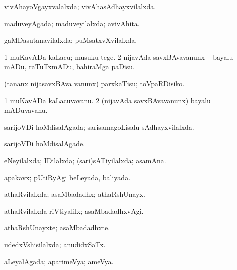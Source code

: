 \bentry
{} 
\gl{\gu}
\expl{}
\bmng
vivAhayoVgayxvalalxda; vivAhasAdhayxvilalxda. 
\emng
\eentry

\bentry
{} 
\gl{\gu}
\expl{}
\bmng
maduveyAgada; maduveyilalxda; avivAhita. 
\emng
\eentry

\bentry
{} 
\gl{\gu}
\expl{}
\bmng
gaMDasutanavilalxda; puMsatxvXvilalxda. 
\emng
\eentry

\bentry
{} 
\gl{\sakirx}
\expl{}
\bmng
\bnum
\num{1} muKavADa kaLacu; musuku tege. 
\num{2} nijavAda savxBAvavanunx -- bayalu mADu, raTuTxmADu, bahiraMga paDisu. 
\enum
\emng

\noindent 
\gl{\akirx}
\expl{}
\bmng
(tananx nijasavxBAva \mo vanunx) parxkaTisu; toVpaRDisiko. 
\emng
\eentry

\bentry
{} 
\gl{\nA}
\expl{}
\bmng
\bnum
\num{1} muKavADa kaLacuvavanu. 
\num{2} (nijavAda savxBAvavanunx) bayalu mADuvavanu. 
\enum
\emng
\eentry

\bentry
{} 
\gl{\gu}
\expl{}
\bmng
sarijoVDi hoMdisalAgada; sarisamagoLisalu sAdhayxvilalxda. 
\emng
\eentry

\bentry
{} 
\gl{\kirxvi}
\expl{}
\bmng
sarijoVDi hoMdisalAgade. 
\emng
\eentry

\bentry
{} 
\gl{\gu}
\expl{}
\bmng
eNeyilalxda; IDilalxda; (sari)sATiyilalxda; asamAna. 
\emng
\eentry

\bentry
{} 
\gl{\gu}
\expl{}
\bmng
apakavx; pUtiRyAgi beLeyada, baliyada. 
\emng
\eentry

\bentry
{} 
\gl{\gu}
\expl{}
\bmng
athaRvilalxda; asaMbadadhx; athaRshUnayx. 
\emng
\eentry

\bentry
{} 
\gl{\kirxvi}
\expl{}
\bmng
athaRvilalxda riVtiyalilx; asaMbadadhxvAgi. 
\emng
\eentry

\bentry
{} 
\gl{\nA}
\expl{}
\bmng
athaRshUnayxte; asaMbadadhxte. 
\emng
\eentry

\bentry
{} 
\gl{\gu}
\bmng
udedxVshisilalxda; anudidxSaTx. 
\emng
\eentry

\bentry
{} 
\gl{\gu}
\expl{}
\bmng
aLeyalAgada; aparimeVya; ameVya. 
\emng
\eentry

